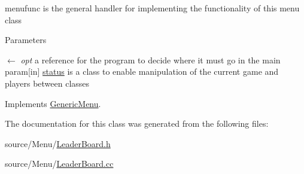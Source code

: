 menufunc is the general handler for implementing the functionality of this menu class 
\begin{DoxyParams}{Parameters}
\item[\mbox{$\leftarrow$} {\em opt}]a reference for the program to decide where it must go in the main param\mbox{[}in\mbox{]} \hyperlink{classstatus}{status} is a class to enable manipulation of the current game and players between classes \end{DoxyParams}


Implements \hyperlink{classGenericMenu_a290ad7ec3331edc968190b1d7b48a397}{GenericMenu}.

The documentation for this class was generated from the following files:\begin{DoxyCompactItemize}
\item 
source/Menu/\hyperlink{LeaderBoard_8h}{LeaderBoard.h}\item 
source/Menu/\hyperlink{LeaderBoard_8cc}{LeaderBoard.cc}\end{DoxyCompactItemize}
